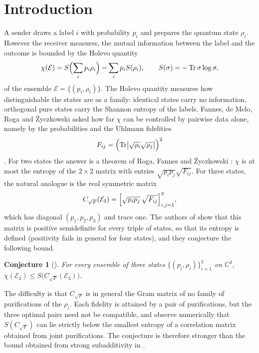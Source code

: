 \documentclass[11pt,a4paper]{article}
\newtheorem{conjecture}[theorem]{Conjecture}
\theoremstyle{definition}
\theoremstyle{plain}
\DeclareMathOperator{\Tr}{Tr}
\newcommand{\C}{\mathbb{C}}
\newcommand{\CF}{C_{\sqrt F}}
\begin{document}
\section{Introduction}
A sender draws a label $i$ with probability $p_i$ and prepares the quantum
state $\rho_i$. However the receiver measures, the mutual information between
the label and the outcome is bounded by the Holevo quantity
\begin{equation}\label{eq:chi}
\chi(\mathcal E)=S\Bigl(\sum_ip_i\rho_i\Bigr)-\sum_ip_iS(\rho_i),
\qquad S(\sigma)=-\Tr\sigma\log\sigma ,
\end{equation}
of the ensemble $\mathcal E=\{(p_i,\rho_i)\}$. The Holevo quantity measures how
distinguishable the states are as a family: identical states carry no
information, orthogonal pure states carry the Shannon entropy of the labels.
Fannes, de Melo, Roga and \.Zyczkowski \cite{FdMRZ2012} asked how far $\chi$ can
be controlled by pairwise data alone, namely by the probabilities and the
Uhlmann fidelities
\begin{equation}\label{eq:fid}
F_{ij}=\Bigl(\Tr\bigl|\sqrt{\rho_i}\sqrt{\rho_j}\bigr|\Bigr)^2
\end{equation}
\cite{Uhlmann1976,Jozsa1994}. For two states the answer is a theorem of Roga,
Fannes and \.Zyczkowski \cite{RFZ2010}: $\chi$ is at most the entropy of the
$2\times2$ matrix with entries $\sqrt{p_ip_j}\sqrt{F_{ij}}$. For three states,
the natural analogue is the real symmetric matrix
\begin{equation}\label{eq:C}
\CF(\mathcal E_3)=\Bigl[\sqrt{p_ip_j}\,\sqrt{F_{ij}}\Bigr]_{i,j=1}^3 ,
\end{equation}
which has diagonal $(p_1,p_2,p_3)$ and trace one. The authors of
\cite{FdMRZ2012} show that this matrix is positive semidefinite for every
triple of states, so that its entropy is defined (positivity fails in general
for four states), and they conjecture the following bound.

\begin{conjecture}[{\cite[Conjecture~1]{FdMRZ2012}}]\label{conj}
For every ensemble of three states $\{(p_i,\rho_i)\}_{i=1}^3$ on $\C^d$,
$\chi(\mathcal E_3)\le S\bigl(\CF(\mathcal E_3)\bigr)$.
\end{conjecture}

The difficulty is that $\CF$ is in general the Gram matrix of no family of
purifications of the $\rho_i$. Each fidelity is attained by a pair of
purifications, but the three optimal pairs need not be compatible, and
\cite{FdMRZ2012} observe numerically that $S(\CF)$ can lie strictly below the
smallest entropy of a correlation matrix obtained from joint purifications.
The conjecture is therefore stronger than the bound obtained from strong
subadditivity in \cite{RFZ2010}.
\end{document}
